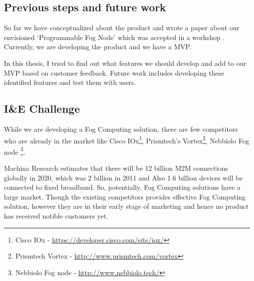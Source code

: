 \subsection{Previous steps and future work}

So far we have conceptualized about the product and wrote a paper about our envisioned `Programmable Fog Node' which was accepted in a workshop \citep{ProgFogNode}. Currently, we are developing the product and we have a \ac{MVP}.

In this thesis, I tried to find out what features we should develop and add to our \ac{MVP} based on customer feedback. Future work includes developing these identified features and test them with users. 






\subsection{I\&E Challenge}

While we are developing a Fog Computing solution, there are few competitors who are already in the market like Cisco IOx\footnote{Cisco IOx - \url{https://developer.cisco.com/site/iox/}}, Prismtech's Vortex\footnote{Prismtech Vortex - \url{http://www.prismtech.com/vortex}}, Nebbiolo Fog node \footnote{Nebbiolo Fog node - \url{http://www.nebbiolo.tech/}}. %

Machina Research estimates that there will be 12 billion \ac{M2M} connections globally in 2020, which was 2 billion in 2011 and Also 1.6 billion devices will be connected to fixed broadband\citep{machinareport}. So, potentially, Fog Computing solutions have a large market. Though the existing competitors provides effective Fog Computing solution, however they are in their early stage of marketing and hence no product has received notible customers yet. 

